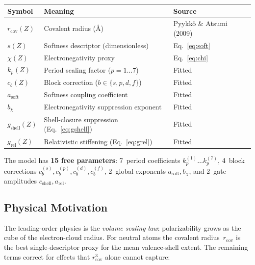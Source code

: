 \documentclass[11pt,letterpaper]{article}
\newcommand{\rcov}{r_{\mathrm{cov}}}
\newcommand{\kp}{k_p}
\newcommand{\cb}{c_b}
\newcommand{\asoft}{a_{\mathrm{soft}}}
\newcommand{\bchi}{b_\chi}
\begin{document}
\begin{center}
\begin{tabular}{lll}
\toprule
\textbf{Symbol} & \textbf{Meaning} & \textbf{Source} \\
\midrule
$\rcov(Z)$  & Covalent radius (\AA) & Pyykk\"o \& Atsumi (2009) \\
$s(Z)$      & Softness descriptor (dimensionless) & Eq.~\eqref{eq:soft} \\
$\chi(Z)$   & Electronegativity proxy & Eq.~\eqref{eq:chi} \\
$\kp(Z)$    & Period scaling factor ($p = 1 \ldots 7$) & Fitted \\
$\cb(Z)$    & Block correction ($b \in \{s,p,d,f\}$) & Fitted \\
$\asoft$    & Softness coupling coefficient & Fitted \\
$\bchi$     & Electronegativity suppression exponent & Fitted \\
$g_{\text{shell}}(Z)$ & Shell-closure suppression (Eq.~\ref{eq:gshell}) & Fitted \\
$g_{\text{rel}}(Z)$   & Relativistic stiffening (Eq.~\ref{eq:grel}) & Fitted \\
\bottomrule
\end{tabular}
\end{center}

\noindent
The model has \textbf{15 free parameters}: 7~period coefficients
$\kp^{(1)} \ldots \kp^{(7)}$, 4~block corrections
$\cb^{(s)},\cb^{(p)},\cb^{(d)},\cb^{(f)}$, 2~global exponents
$\asoft, \bchi$, and 2~gate amplitudes $c_{\text{shell}}, a_{\text{rel}}$.

\subsection{Physical Motivation}

The leading-order physics is the \emph{volume scaling law}: polarizability
grows as the cube of the electron-cloud radius.  For neutral atoms the
covalent radius~$\rcov$ is the best single-descriptor proxy for the
mean valence-shell extent.  The remaining terms correct for effects that
$\rcov^3$ alone cannot capture:
\end{document}
